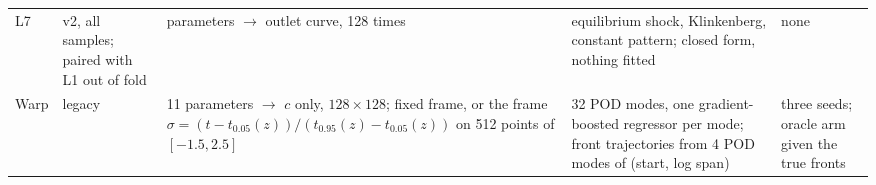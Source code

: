 \begin{table}[p]
\begin{tabular}{@{}p{}p{}p{}p{}p{}@{}}
L7 & v2, all samples; paired with L1 out of fold &
parameters \(\to\) outlet curve, 128 times &
equilibrium shock, Klinkenberg, constant pattern; closed form, nothing fitted & none \\
Warp & legacy &
11 parameters \(\to\) \(c\) only, \(128\times128\); fixed frame, or the frame \(\sigma=(t-t_{0.05}(z))/(t_{0.95}(z)-t_{0.05}(z))\) on 512 points of \([-1.5,2.5]\) &
32 POD modes, one gradient-boosted regressor per mode; front trajectories from 4 POD modes of (start, log span) &
three seeds; oracle arm given the true fronts \\
\bottomrule
\end{tabular}
\end{table}

